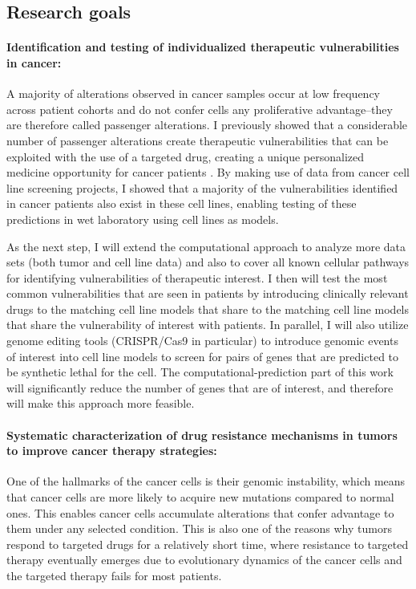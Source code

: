 \documentclass[11pt,letterpaper]{article}
\begin{document}
\subsection*{Research goals}
\paragraph{Identification and testing of individualized therapeutic vulnerabilities in cancer:}
A majority of alterations observed in cancer samples occur at low frequency across patient cohorts
and do not confer cells any proliferative advantage--they are therefore called passenger alterations.
I previously showed that a considerable number of passenger alterations create therapeutic vulnerabilities that can be exploited with the use of a targeted drug, creating a unique personalized medicine opportunity for cancer patients \cite{aksoy2014prediction}.
By making use of data from cancer cell line screening projects,
I showed that a majority of the vulnerabilities identified in cancer patients also exist in these cell lines,
enabling testing of these predictions in wet laboratory using cell lines as models.

As the next step, I will extend the computational approach to analyze more data sets (both tumor and cell line data) and also to cover all known cellular pathways for identifying vulnerabilities of therapeutic interest.
I then will test the most common vulnerabilities that are seen in patients by introducing clinically relevant drugs to the matching cell line models that share to the matching cell line models that share the vulnerability of interest with patients.
In parallel, I will also utilize genome editing tools (CRISPR/Cas9 in particular)
to introduce genomic events of interest into cell line models to screen for pairs of genes that are predicted to be synthetic lethal for the cell.
The computational-prediction part of this work will significantly reduce the number of genes that are of interest, 
and therefore will make this approach more feasible.

\paragraph{Systematic characterization of drug resistance mechanisms in tumors to improve cancer therapy strategies:}
One of the hallmarks of the cancer cells is their genomic instability, 
which means that cancer cells are more likely to acquire new mutations compared to normal ones.
This enables cancer cells accumulate alterations that confer advantage to them under any selected condition.
This is also one of the reasons why tumors respond to targeted drugs for a relatively short time,
where resistance to targeted therapy eventually emerges due to evolutionary dynamics of the cancer cells
and the targeted therapy fails for most patients.
\end{document}
